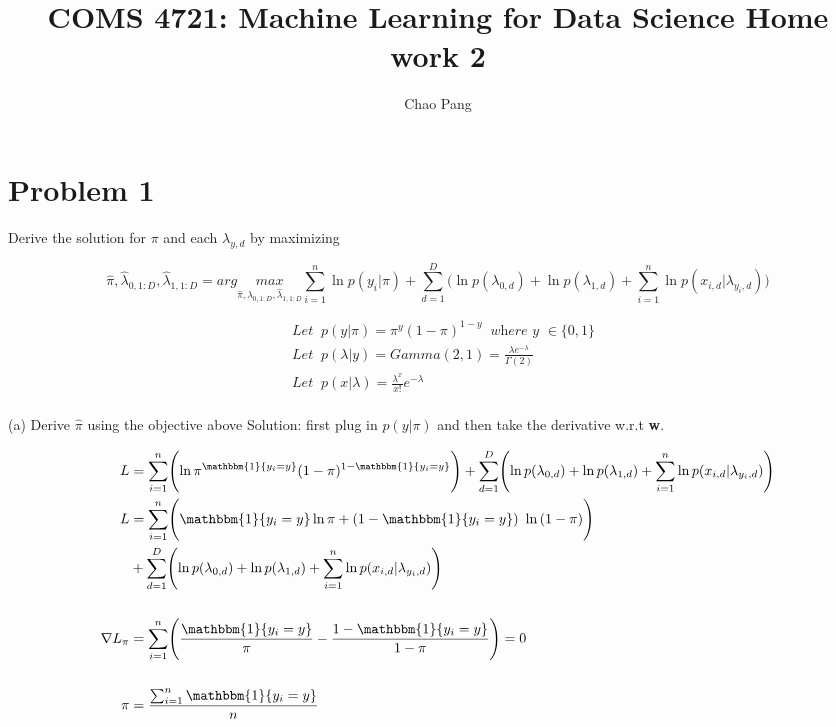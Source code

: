 \documentclass[11pt]{report}
\begin{document}
\title{COMS 4721: Machine Learning for Data Science 
Home work 2}
\author{Chao Pang}
 
\maketitle

\section* {Problem 1}
Derive the solution for $\pi$ and each $\lambda_{y,d}$ by maximizing 

\[ \hat{\pi}, \hat{\lambda}_{0, 1:D}, \hat{\lambda}_{1, 1:D}  =  arg \underset{\hat{\pi}, \hat{\lambda}_{0, 1:D}, \hat{\lambda}_{1, 1:D} }{max} \sum_{i=1}^{n} \ln {p(y_{i}|\pi)} +  \sum_{d=1}^{D} \Biggl( \ln{p(\lambda_{0,d})} + \ln{p(\lambda_{1,d})}  + \sum_{i=1}^{n} \ln{p(x_{i,d} | \lambda_{y_{i},d}) \Biggr)} \]


\begin{align*} 
& \textit{Let} \;\; p(y | \pi)  = \pi^{y} (1 - \pi)^{1 - y}   \;\; \textit{where y $\in \{0, 1\}$}\\
& \textit{Let} \;\; p(\lambda | y)  = Gamma(2, 1) = \frac{ \lambda e^{-\lambda} } {\Gamma(2)}  \\
& \textit{Let} \;\; p(x | \lambda) = \frac{ \lambda^x} {x!}e^{-\lambda} \\
\end{align*}

\justify (a) Derive $\hat{\pi}$ using the objective above
\justify Solution: first plug in $p(y | \pi) $ and then take the derivative w.r.t \textbf{w}. 

\begin{align*} 
L &= \sum_{i=1}^{n} \Biggl( \ln{\pi^{ \mathbbm{1}\{ y_{i} = y \}  } (1 - \pi)^{ 1 - \mathbbm{1}\{ y_{i} = y \}  } } \Biggr) + \sum_{d=1}^{D} \Biggl( \ln{p(\lambda_{0,d})} + \ln{p(\lambda_{1,d})}  + \sum_{i=1}^{n} \ln{p(x_{i,d} | \lambda_{y_{i},d})} \Biggr) \\
L &= \sum_{i=1}^{n} \Biggl( \mathbbm{1}\{ y_{i} = y \}  \ln{\pi} + ({ 1 - \mathbbm{1}\{ y_{i} = y \}  }) \ln{(1 - \pi)}  \Biggr) \\
& + \sum_{d=1}^{D} \Biggl( \ln{p(\lambda_{0,d})} + \ln{p(\lambda_{1,d})}  + \sum_{i=1}^{n} \ln{p(x_{i,d} | \lambda_{y_{i},d})} \Biggr) \\
\\
\nabla{L_{\pi}} &= \sum_{i=1}^{n} \Biggl( \frac{ \mathbbm{1}\{ y_{i} = y \}  }{\pi} - \frac{ 1 - \mathbbm{1}\{ y_{i} = y \}  } { 1 - \pi}  \Biggr)  = 0 \\
\\
\pi &= \frac { \sum_{i=1}^{n} \mathbbm{1}\{ y_{i} = y \} } {n} \\ 
\end{align*}
\end{document}
